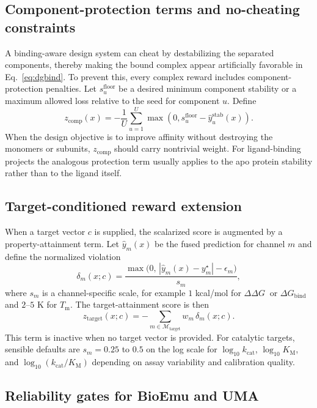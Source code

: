 \documentclass[11pt]{article}
\newcommand{\ddG}{\ensuremath{\Delta\Delta G \ }}
\newcommand{\Tm}{\ensuremath{T_{\mathrm m}}}
\newcommand{\logkcat}{\ensuremath{\log_{10} k_{\mathrm{cat}}}}
\newcommand{\logKm}{\ensuremath{\log_{10} K_{\mathrm M}}}
\newcommand{\logeff}{\ensuremath{\log_{10}(k_{\mathrm{cat}}/K_{\mathrm M})}}
\newcommand{\dGbind}{\ensuremath{\Delta G_{\mathrm{bind}}}}
\begin{document}
	\subsection{Component-protection terms and no-cheating constraints}
	
	A binding-aware design system can cheat by destabilizing the separated components, thereby making the bound complex appear artificially favorable in Eq.~\eqref{eq:dgbind}. To prevent this, every complex reward includes component-protection penalties. Let $s_u^{\mathrm{floor}}$ be a desired minimum component stability or a maximum allowed loss relative to the seed for component $u$. Define
	\begin{equation}
		z_{\mathrm{comp}}(x) = -\frac{1}{U}\sum_{u=1}^{U}\max\!\left(0, s_u^{\mathrm{floor}}-\widehat y_u^{\mathrm{stab}}(x)\right).
	\end{equation}
	When the design objective is to improve affinity without destroying the monomers or subunits, $z_{\mathrm{comp}}$ should carry nontrivial weight. For ligand-binding projects the analogous protection term usually applies to the apo protein stability rather than to the ligand itself.
	
	\subsection{Target-conditioned reward extension}
	
	When a target vector $c$ is supplied, the scalarized score is augmented by a property-attainment term. Let $\widehat y_m(x)$ be the fused prediction for channel $m$ and define the normalized violation
	\begin{equation}
		\label{eq:targetviol}
		\delta_m(x;c)=\frac{\max\big(0,\,|\widehat y_m(x)-y_m^{\star}|-\epsilon_m\big)}{s_m},
	\end{equation}
	where $s_m$ is a channel-specific scale, for example $1$ kcal/mol for $\ddG$ or $\dGbind$ and $2$--$5$ K for $\Tm$. The target-attainment score is then
	\begin{equation}
		z_{\mathrm{target}}(x;c)=-\sum_{m\in\mathcal{M}_{\mathrm{target}}} w_m\,\delta_m(x;c).
	\end{equation}
	This term is inactive when no target vector is provided. For catalytic targets, sensible defaults are $s_m=0.25$ to $0.5$ on the log scale for $\logkcat$, $\logKm$, and $\logeff$ depending on assay variability and calibration quality.
	
	\subsection{Reliability gates for BioEmu and UMA}
	
\end{document}
